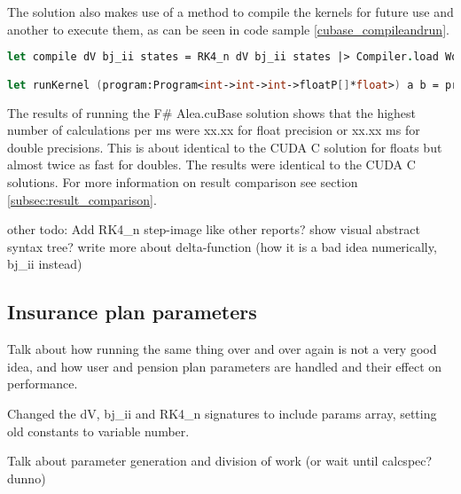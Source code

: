 The solution also makes use of a method to compile the kernels for future use and another to execute them, as can be seen in code sample \ref{cubase_compileandrun}. 

\begin{lstlisting}[language=FSharp, caption=Kernel compilation and execution methods in F\# Alea.cuBase, label=cubase_compileandrun]
let compile dV bj_ii states = RK4_n dV bj_ii states |> Compiler.load Worker.Default

let runKernel (program:Program<int->int->int->floatP[]*float>) a b = program.Run a b steps
\end{lstlisting}

The results of running the F\# Alea.cuBase solution shows that the highest number of calculations per ms were xx.xx for float precision or xx.xx ms for double precisions.
This is about identical to the CUDA C solution for floats but almost twice as fast for doubles.
The results were identical to the CUDA C solutions. For more information on result comparison see section \ref{subsec:result_comparison}.

other todo: 
	Add RK4\_n step-image like other reports? 
	show visual abstract syntax tree? 
	write more about delta-function (how it is a bad idea numerically, bj\_ii instead)



\subsection{Insurance plan parameters}
Talk about how running the same thing over and over again is not a very good idea, and how user and pension plan parameters are handled and their effect on performance.

Changed the dV, bj\_ii and RK4\_n signatures to include params array, setting old constants to variable number.

Talk about parameter generation and division of work (or wait until calcspec? dunno)